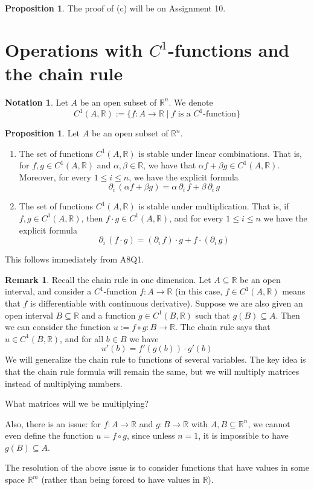 \documentclass[11pt]{article}
\makeatletter
\theoremstyle{definition}
\newtheorem{prop}[thm]{Proposition}
\newtheorem{remark}[thm]{Remark}
\newtheorem{notation}[thm]{Notation}
\newcommand{\R}{\ensuremath{\mathbb{R}}}
\newenvironment{pf}[1][\proofname]{\par
  \pushQED{\qed}%
  \normalfont \topsep0\p@\relax
  \trivlist
  \item[\hskip\labelsep\itshape
  #1\@addpunct{.}]\ignorespaces
}{%
  \popQED\endtrivlist\@endpefalse
}
\makeatother
\begin{document}
\begin{prop}
\begin{pf}
The proof of (c) will be on Assignment 10.
\end{pf}
\end{prop}

\newpage
{}
\section{Operations with $C^1$-functions and the chain rule}
\begin{notation}
Let $A$ be an open subset of $\R^n$. We denote
$$C^1(A, \R) := \{f : A \to \R \mid f \text{ is a $C^1$-function}\}$$
\end{notation}

\begin{prop}
Let $A$ be an open subset of $\R^n$.\vspace{-1.5ex}
\begin{enumerate}[(1)]
\item The set of functions $C^1(A, \R)$ is stable under linear combinations. That is, for $f, g \in C^1(A, \R)$ and $\alpha, \beta \in \R$, we have that $\alpha f + \beta g \in C^1(A, \R)$. Moreover, for every $1 \leq i \leq n$, we have the explicit formula
$$\partial_i\,(\alpha f + \beta g) = \alpha\,\partial_i\,f + \beta \, \partial_i\,g$$
\item The set of functions $C^1(A, \R)$ is stable under multiplication. That is, if $f, g \in C^1(A, \R)$, then $f \cdot g \in C^1(A, \R)$, and for every $1 \leq i \leq n$ we have the explicit formula
$$\partial_i \, (f \cdot g) = (\partial_i\,f) \cdot g + f \cdot (\partial_i\,g)$$
\end{enumerate}
\begin{pf}
This follows immediately from A8Q1.
\end{pf}
\end{prop}

\begin{remark}
Recall the chain rule in one dimension. Let $A \subseteq \R$ be an open interval, and consider a $C^1$-function $f : A \to \R$ (in this case, $f \in C^1(A, \R)$ means that $f$ is differentiable with continuous derivative). Suppose we are also given an open interval $B \subseteq \R$ and a function $g \in C^1(B, \R)$ such that $g(B) \subseteq A$. Then we can consider the function $u := f \circ g : B \to \R$. The chain rule says that $u \in C^1(B, \R)$, and for all $b \in B$ we have
$$u'(b) = f'(g(b)) \cdot g'(b)$$
We will generalize the chain rule to functions of several variables. The key idea is that the chain rule formula will remain the same, but we will multiply matrices instead of multiplying numbers.

What matrices will we be multiplying?

Also, there is an issue: for $f : A \to \R$ and $g : B \to \R$ with $A, B \subseteq \R^n$, we cannot even define the function $u = f \circ g$, since unless $n = 1$, it is impossible to have $g(B) \subseteq A$. 

The resolution of the above issue is to consider functions that have values in some space $\R^m$ (rather than being forced to have values in $\R$).
\end{remark}
\end{document}
